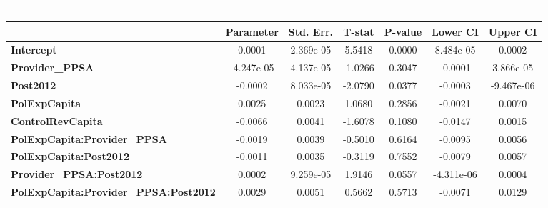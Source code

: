 \begin{center}
\begin{tabular}{lclc}
\textbf{}                                     &                    & \textbf{                     }   &                  \\
\bottomrule
\end{tabular}
\begin{tabular}{lcccccc}
                                              & \textbf{Parameter} & \textbf{Std. Err.} & \textbf{T-stat} & \textbf{P-value} & \textbf{Lower CI} & \textbf{Upper CI}  \\
\midrule
\textbf{Intercept}                            &       0.0001       &     2.369e-05      &      5.5418     &      0.0000      &     8.484e-05     &       0.0002       \\
\textbf{Provider\_PPSA}                       &     -4.247e-05     &     4.137e-05      &     -1.0266     &      0.3047      &      -0.0001      &     3.866e-05      \\
\textbf{Post2012}                             &      -0.0002       &     8.033e-05      &     -2.0790     &      0.0377      &      -0.0003      &     -9.467e-06     \\
\textbf{PolExpCapita}                         &       0.0025       &       0.0023       &      1.0680     &      0.2856      &      -0.0021      &       0.0070       \\
\textbf{ControlRevCapita}                     &      -0.0066       &       0.0041       &     -1.6078     &      0.1080      &      -0.0147      &       0.0015       \\
\textbf{PolExpCapita:Provider\_PPSA}          &      -0.0019       &       0.0039       &     -0.5010     &      0.6164      &      -0.0095      &       0.0056       \\
\textbf{PolExpCapita:Post2012}                &      -0.0011       &       0.0035       &     -0.3119     &      0.7552      &      -0.0079      &       0.0057       \\
\textbf{Provider\_PPSA:Post2012}              &       0.0002       &     9.259e-05      &      1.9146     &      0.0557      &     -4.311e-06    &       0.0004       \\
\textbf{PolExpCapita:Provider\_PPSA:Post2012} &       0.0029       &       0.0051       &      0.5662     &      0.5713      &      -0.0071      &       0.0129       \\
\bottomrule
\end{tabular}
\end{center}